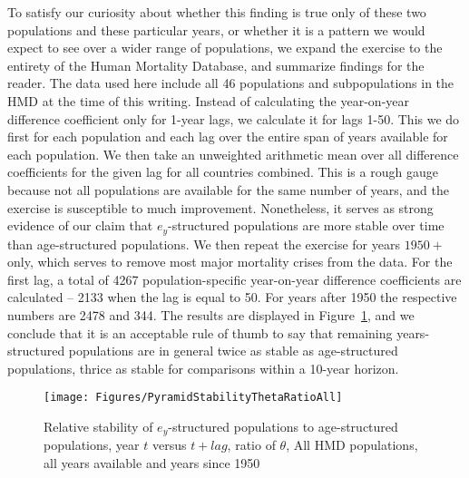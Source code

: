To satisfy our curiosity about whether this finding is true only of these two
populations and these particular years, or whether it is a pattern we would
expect to see over a wider range of populations, we expand the exercise to the
entirety of the Human Mortality Database, and summarize findings for the reader.
The data used here include all 46 populations and subpopulations in the HMD at 
the time of this writing. Instead of calculating the year-on-year
 difference coefficient only for 1-year lags, we calculate it for lags 1-50.
 This we do first for each population and each lag over the entire span of years
 available for each population. We then take an unweighted arithmetic mean over
 all difference coefficients for the given lag for all countries combined. This is a rough
 gauge because not all populations are available for the same number of years,
 and the exercise is susceptible to much improvement. Nonetheless, it serves as 
 strong evidence of our claim that
 $e_y$-structured populations are more stable over time than age-structured populations.
  We then repeat the exercise for years $1950+$ only, which serves to remove most 
  major mortality crises from the data. For the first
 lag, a total of 4267 population-specific year-on-year difference coefficients
 are calculated -- 2133 when the lag is equal to 50. For years after 1950 the
 respective numbers are 2478 and 344. The results are displayed in
 Figure~\ref{fig:PyramidStabilityAll}, and we conclude that it is an acceptable
  rule of thumb to say that remaining
 years-structured populations are in general twice as stable as age-structured
 populations, thrice as stable for comparisons within a 10-year horizon.
 
\begin{figure}
      \centering
      \caption{Relative stability of $e_y$-structured populations to
                age-structured populations, year $t$ versus $t+lag$, ratio of
                $\theta$, All HMD populations, all years available and years
                since 1950}
         \texttt{[image: Figures/PyramidStabilityThetaRatioAll]}
      \label{fig:PyramidStabilityAll} 
\end{figure}

\FloatBarrier